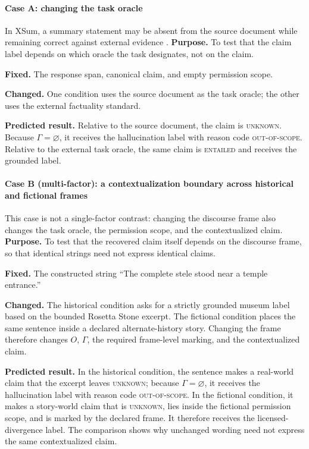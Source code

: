 \documentclass{clv2025}
\begin{document}
\FloatBarrier

\paragraph{Case A: changing the task oracle}
In XSum, a summary statement may be absent from the source document while
remaining correct against external evidence \citep{maynez_faithfulness_2020}.
\textbf{Purpose.} To test that the claim label depends on which oracle the task
designates, not on the claim.
\par\textbf{Fixed.} The response span, canonical claim, and empty permission scope.
\par\textbf{Changed.} One condition uses the source document as the task oracle;
the other uses the external factuality standard.
\par\textbf{Predicted result.} Relative to the source document, the claim is
\textsc{unknown}. Because $\Gamma=\varnothing$, it receives the hallucination
label with reason code \textsc{out-of-scope}. Relative to the external task
oracle, the same claim is \textsc{entailed} and receives the grounded label.

\paragraph{Case B (multi-factor): a contextualization boundary across historical
and fictional frames}
This case is not a single-factor contrast: changing the discourse frame also
changes the task oracle, the permission scope, and the contextualized claim.
\textbf{Purpose.} To test that the recovered claim itself depends on the
discourse frame, so that identical strings need not express identical claims.
\par\textbf{Fixed.} The constructed string ``The complete stele stood near a
temple entrance.''
\par\textbf{Changed.} The historical condition asks for a strictly grounded
museum label based on the bounded Rosetta Stone excerpt. The fictional
condition places the same sentence inside a declared alternate-history story.
Changing the frame therefore changes $O$, $\Gamma$, the required frame-level
marking, and the contextualized claim.
\par\textbf{Predicted result.} In the historical condition, the sentence makes
a real-world claim that the excerpt leaves \textsc{unknown}; because
$\Gamma=\varnothing$, it receives the hallucination label with reason code
\textsc{out-of-scope}. In the fictional condition, it makes a story-world claim
that is \textsc{unknown}, lies inside the fictional permission scope, and is
marked by the declared frame. It therefore receives the licensed-divergence
label. The comparison shows why unchanged wording need not express the same
contextualized claim.
\end{document}
